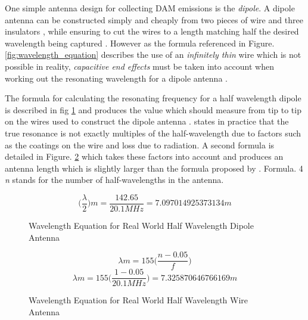 \documentclass[runningheads,a4paper]{llncs}
\begin{document}
One simple antenna design for collecting \gls{DAM} emissions is the \textit{dipole}. A dipole antenna can be constructed simply and cheaply from two pieces of wire and three insulators \citep{nasa12}, while ensuring to cut the wires to a length matching half the desired wavelength being captured \citep{nasa12}. However as the formula referenced in Figure. \ref{fig:wavelength_equation} describes the use of an \textit{infinitely thin} wire which is not possible in reality, \textit{capacitive end effects} must be taken into account when working out the resonating wavelength for a dipole antenna \citep{nasa12}.

The formula for calculating the resonating frequency for a half wavelength dipole is described in fig \ref{fig:wavelength_equation_dipole} and produces the value which should measure from tip to tip on the wires used to construct the dipole antenna \citep{nasa12}. \cite{RSGB-14} states in practice that the true resonance is not exactly multiples of the half-wavelength due to factors such as the coatings on the wire and loss due to radiation. A second formula is detailed in Figure. \ref{fig:wavelength_equation_wire_antenna} which takes these factors into account and produces an antenna length which is slightly larger than the formula proposed by \citep{nasa12}. Formula. 4 \textit{n} stands for the number of half-wavelengths in the antenna.

%
\begin{figure}[here]
  \centering
  \begin{equation}  	
    \bigg(\frac{\lambda}{2}\bigg)m = \frac{142.65}{20.1 MHz} = 7.097014925373134 m
  \end{equation}
  \caption{Wavelength Equation for Real World Half Wavelength Dipole Antenna}
  \label{fig:wavelength_equation_dipole}
\end{figure}
%

%
\begin{figure}[here]
  \centering
  \begin{equation}  	
    \lambda m = 155 \bigg(\frac{n - 0.05}{f}\bigg)
  \end{equation}
  \begin{equation}  	
    \lambda m = 155 \bigg(\frac{1 - 0.05}{20.1 MHz}\bigg)  = 7.325870646766169 m
  \end{equation}
  \caption{Wavelength Equation for Real World Half Wavelength Wire Antenna}
  \label{fig:wavelength_equation_wire_antenna}
\end{figure}
%
\end{document}
